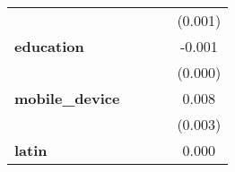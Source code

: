 \begin{center}
\begin{tabular}{lcccc}
\textbf{ }                              &                  &                  &                  &     (0.001)       \\
\textbf{education}                      &                  &                  &                  &      -0.001       \\
\textbf{ }                              &                  &                  &                  &     (0.000)       \\
\textbf{mobile\_device}                 &                  &                  &                  &      0.008        \\
\textbf{ }                              &                  &                  &                  &     (0.003)       \\
\textbf{latin}                          &                  &                  &                  &      0.000        \\
\bottomrule
\end{tabular}
\end{center}